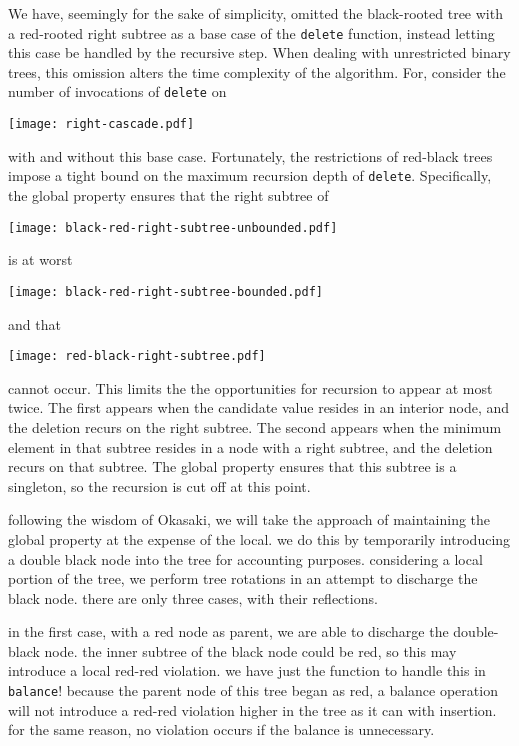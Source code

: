 \documentclass[preprint]{sigplanconf}
\begin{document}
We have, seemingly for the sake of simplicity, omitted the black-rooted tree with a red-rooted right subtree as a base case of the \texttt{delete} function, instead letting this case be handled by the recursive step. When dealing with unrestricted binary trees, this omission alters the time complexity of the algorithm. For, consider the number of invocations of \texttt{delete} on
\begin{center}
\texttt{[image: right-cascade.pdf]}
\end{center}
with and without this base case. Fortunately, the restrictions of red-black trees impose a tight bound on the maximum recursion depth of \texttt{delete}. Specifically, the global property ensures that the right subtree of
\begin{center}
\texttt{[image: black-red-right-subtree-unbounded.pdf]}
\end{center}
is at worst
\begin{center}
\texttt{[image: black-red-right-subtree-bounded.pdf]}
\end{center}
and that
\begin{center}
\texttt{[image: red-black-right-subtree.pdf]}
\end{center}
cannot occur. This limits the the opportunities for recursion to appear at most twice. The first appears when the candidate value resides in an interior node, and the deletion recurs on the right subtree. The second appears when the minimum element in that subtree resides in a node with a right subtree, and the deletion recurs on that subtree. The global property ensures that this subtree is a singleton, so the recursion is cut off at this point.

following the wisdom of Okasaki, we will take the approach of maintaining the global property at the expense of the local. we do this by temporarily introducing a double black node into the tree for accounting purposes. considering a local portion of the tree, we perform tree rotations in an attempt to discharge the black node. there are only three cases, with their reflections.

in the first case, with a red node as parent, we are able to discharge the double-black node. the inner subtree of the black node could be red, so this may introduce a local red-red violation. we have just the function to handle this in \texttt{balance}! because the parent node of this tree began as red, a balance operation will not introduce a red-red violation higher in the tree as it can with insertion. for the same reason, no violation occurs if the balance is unnecessary.
\end{document}
